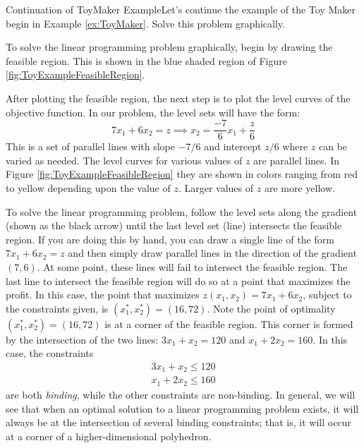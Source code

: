 \begin{example}{Continuation of ToyMaker Example}{}Let's continue the example of the Toy Maker begin in Example \ref{ex:ToyMaker}.  Solve this problem graphically.
\end{example}
\begin{solution} To solve the linear programming problem graphically, begin by drawing the feasible region. This is shown in the blue shaded region of Figure \ref{fig:ToyExampleFeasibleRegion}. 


After plotting the feasible region, the next step is to plot the level curves of the objective function. In our problem, the level sets will have the form:
\begin{displaymath}
7x_1 + 6x_2 = z \implies x_2 = \frac{-7}{6}x_1 + \frac{z}{6}
\end{displaymath}
This is a set of parallel lines with slope $-7/6$ and intercept $z/6$ where $z$ can be varied as needed. The level curves for various values of $z$ are parallel lines. In Figure \ref{fig:ToyExampleFeasibleRegion} they are shown in colors ranging from red to yellow depending upon the value of $z$. Larger values of $z$ are more yellow. 

To solve the linear programming problem, follow the level sets along the gradient (shown as the black arrow) until the last level set (line) intersects the feasible region. If you are doing this by hand, you can draw a single line of the form $7x_1 + 6x_2 = z$ and then simply draw parallel lines in the direction of the gradient $(7,6)$. At some point, these lines will fail to intersect the feasible region. The last line to intersect the feasible region will do so at a point that maximizes the profit. In this case, the point that maximizes $z(x_1,x_2) = 7x_1 + 6x_2$, subject to the constraints given, is $(x_1^*, x_2^*) = (16,72)$. 
\newpage
Note the point of optimality $(x_1^*, x_2^*) = (16,72)$ is at a corner of the feasible region. This corner is formed by the intersection of the two lines: $3x_1 + x_2 = 120$ and $x_1 + 2x_2 = 160$. In this case, the constraints 
\begin{gather*}
3x_1 + x_2 \leq 120\\
x_1 + 2x_2 \leq 160
\end{gather*}
are both \textit{binding}, while the other constraints are non-binding. In general, we will see that when an optimal solution to a linear programming problem exists, it will always be at the intersection of several binding constraints; that is, it will occur at a corner of a higher-dimensional polyhedron.  
\end{solution}

